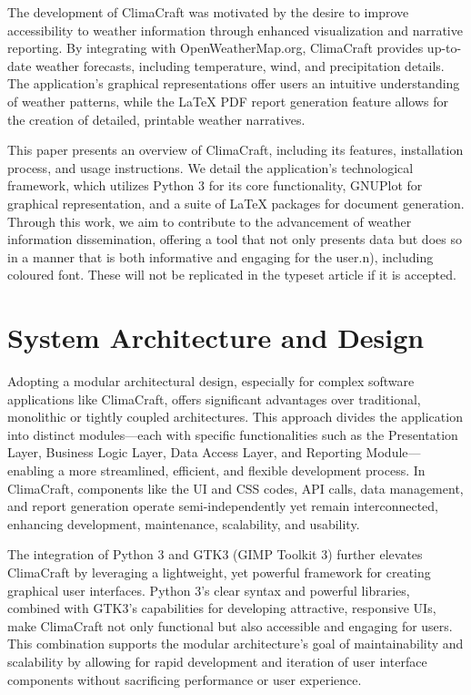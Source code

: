 \documentclass[sn-mathphys-num]{sn-jnl}%
\begin{document}
The development of ClimaCraft was motivated by the desire to improve accessibility to weather information through enhanced visualization and narrative reporting. By integrating with OpenWeatherMap.org, ClimaCraft provides up-to-date weather forecasts, including temperature, wind, and precipitation details. The application's graphical representations offer users an intuitive understanding of weather patterns, while the LaTeX PDF report generation feature allows for the creation of detailed, printable weather narratives.

This paper presents an overview of ClimaCraft, including its features, installation process, and usage instructions. We detail the application's technological framework, which utilizes Python 3 for its core functionality, GNUPlot for graphical representation, and a suite of LaTeX packages for document generation. Through this work, we aim to contribute to the advancement of weather information dissemination, offering a tool that not only presents data but does so in a manner that is both informative and engaging for the user.n), including coloured font. These will not be replicated in the typeset article if it is accepted. 

\section{System Architecture and Design}\label{sec2}

Adopting a modular architectural design, especially for complex software applications like ClimaCraft, offers significant advantages over traditional, monolithic or tightly coupled architectures. This approach divides the application into distinct modules—each with specific functionalities such as the Presentation Layer, Business Logic Layer, Data Access Layer, and Reporting Module—enabling a more streamlined, efficient, and flexible development process. In ClimaCraft, components like the UI and CSS codes, API calls, data management, and report generation operate semi-independently yet remain interconnected, enhancing development, maintenance, scalability, and usability.

The integration of Python 3 and GTK3 (GIMP Toolkit 3) further elevates ClimaCraft by leveraging a lightweight, yet powerful framework for creating graphical user interfaces. Python 3’s clear syntax and powerful libraries, combined with GTK3’s capabilities for developing attractive, responsive UIs, make ClimaCraft not only functional but also accessible and engaging for users. This combination supports the modular architecture's goal of maintainability and scalability by allowing for rapid development and iteration of user interface components without sacrificing performance or user experience.
\end{document}
